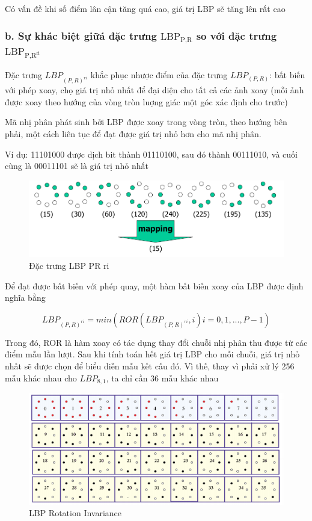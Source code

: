 \documentclass{article}
\begin{document}
	Có vấn đề khi số điểm lân cận tăng quá cao, giá trị LBP sẽ tăng lên rất cao
	
	\subsubsection{b. Sự khác biệt giữá đặc trưng $\text{LBP}_{\text{P,R}}$ so với đặc trưng $\text{LBP}_{\text{P,R}^{\text{ri}}}$}
	
	\qquad Đặc trưng $LBP_{(P, R)^{ri}}$ khắc phục nhược điểm của đặc trưng $LBP_{(P, R)}$: bất biến với phép xoay, chọ giá trị nhỏ nhất để đại diện cho tất cả các ảnh xoay (mỗi ảnh được xoay theo hướng của vòng tròn luợng giác một góc xác định cho trước)
	
	
	Mã nhị phân phát sinh bởi LBP được xoay trong vòng tròn, theo hướng bên phải, một cách liên tục để đạt được giá trị nhỏ hơn cho mã nhị phân.
	
	Ví dụ: 11101000 được dịch bit thành 01110100, sau đó thành 00111010, và cuối cùng là  00011101 sẽ là giá trị nhỏ nhất
	
	\begin{figure}[H]
		\centering
		\includegraphics[width=0.75\linewidth]{images/lbp_ri.png}
		\caption{Đặc trưng LBP PR ri}
		\label{fig:writing-thesis}
	\end{figure}
	
	Để đạt được bất biến với phép quay, một hàm bất biến xoay của LBP được định nghĩa bằng 
	
	\begin{equation}
		LBP_{(P, R)^{ri}} = min(ROR(LBP_{(P, R)^{ri}}, i)i = 0, 1, ..., P-1)
	\end{equation}
	
	Trong đó, ROR là hàm xoay có tác dụng thay đổi chuỗi nhị phân thu được từ các điểm mẫu lần lượt. Sau khi tính toán hết giá trị LBP cho mỗi chuỗi, giá trị nhỏ nhất sẽ được chọn để biểu diễn mẫu kết cấu đó. Vì thế, thay vì phải xử lý 256 mẫu khác nhau cho $LBP_{8, 1}$, ta chỉ cần 36 mẫu khác nhau
	
	\begin{figure}[H]
		\centering
		\includegraphics[width=0.75\linewidth]{images/lbp_rotation_invariant.png}
		\caption{LBP Rotation Invariance}
		\label{fig:writing-thesis}
	\end{figure}
	
\end{document}
